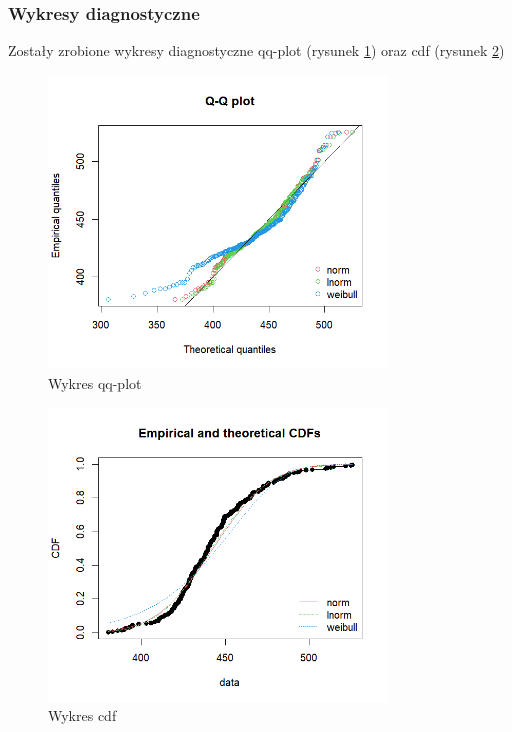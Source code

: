 \documentclass[a4paper,11pt]{article}
\begin{document}
\subsubsection{Wykresy diagnostyczne}
Zostały zrobione wykresy diagnostyczne qq-plot (rysunek \ref{fig:qqplot}) oraz cdf (rysunek \ref{fig:cdf})

\begin{figure}[!htb]
  \centering
  \includegraphics[width=9cm]{qqplot.png}
  \caption{Wykres qq-plot}
  \label{fig:qqplot}
\end{figure}

\begin{figure}[!htb]
  \centering
  \includegraphics[width=9cm]{cdf.png}
  \caption{Wykres cdf}
  \label{fig:cdf}
\end{figure}
\end{document}
